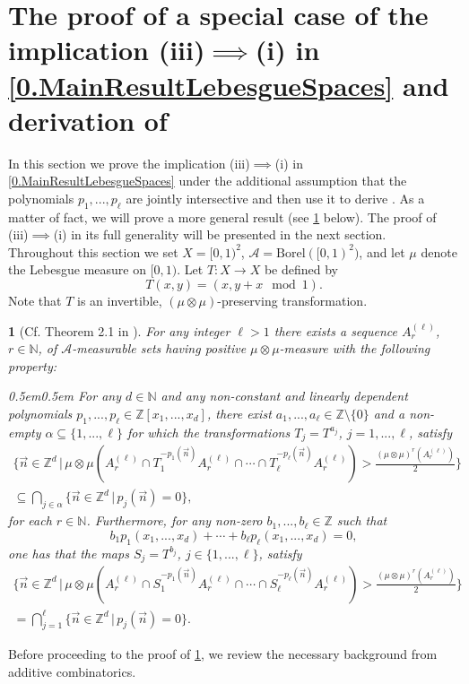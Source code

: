 \documentclass[11pt,american,preprint]{elsarticle}
\numberwithin{equation}{section}
\theoremstyle{plain}
\newtheorem{thm}{\protect\theoremname}[section]
\theoremstyle{plain*}
\theoremstyle{plain}
\theoremstyle{plain*}
\theoremstyle{plain}
\theoremstyle{plain*}
\theoremstyle{remark}
\theoremstyle{remark*}
\theoremstyle{remark}
\theoremstyle{remark*}
\theoremstyle{remark}
\theoremstyle{remark*}
\theoremstyle{plain}
\theoremstyle{definition}
\theoremstyle{plain}
\theoremstyle{plain} %
\providecommand{\theoremname}{Theorem}
\newcommand{\N}{\mathbb{N}}
\newcommand{\Z}{\mathbb{Z}}
\begin{document}
\section{The proof of  a special case of the implication (iii)$\implies$(i) in \cref{0.MainResultLebesgueSpaces} and derivation of }\label{Sec:5}
In this section we prove the implication (iii)$\implies$(i) in \cref{0.MainResultLebesgueSpaces} under the additional assumption that the polynomials $p_1,...,p_\ell$ are jointly intersective and then use it to derive . As a matter of fact, we will prove a more general result (see \cref{5.thm:SmallIntersections} below). The proof of  (iii)$\implies$(i) in its full generality will be presented in the next section. \\ 
Throughout this section we  set $X=[0,1)^2$, $\mathcal A=\text{Borel}([0,1)^2)$, and let $\mu$ denote the Lebesgue measure on $[0,1)$. Let $T:X\rightarrow X$ be defined by 
$$
T(x,y)=(x,y+x\mod 1).
$$
Note that $T$ is an invertible, $(\mu\otimes\mu)$-preserving transformation.
\begin{thm}[Cf. Theorem 2.1 in \cite{BHKNilSystems2005}]\label{5.thm:SmallIntersections}
    For any integer $\ell>1$ there exists a sequence $A_r^{(\ell)}$, $r\in\N$,  of  $\mathcal A$-measurable sets having positive $\mu\otimes\mu$-measure with the following property:\\
    \begin{adjustwidth}{0.5em}{0.5em}
    For any $d\in\N$ and any non-constant and linearly dependent polynomials $p_1,...,p_\ell\in\Z[x_1,...,x_d]$, there exist $a_1,...,a_\ell\in\Z\setminus\{0\}$ and a non-empty $\alpha\subseteq \{1,...,\ell\}$ for which the transformations $T_j=T^{a_j}$, $j=1,...,\ell$, satisfy 
    \begin{multline}\label{LongExpressionsWithFewElements}
\{\vec n\in\Z^d\,|\,\mu\otimes\mu(A_r^{(\ell)}\cap T_1^{-p_1(\vec n)}A_r^{(\ell)}\cap\cdots\cap T_\ell^{- p_\ell(\vec n)}A_r^{(\ell)})
>\frac{(\mu\otimes\mu)^r(A_r^{(\ell)})}{2}\}\\
\subseteq \bigcap_{j\in\alpha}\{\vec n\in\Z^d\,|\,p_j(\vec n)=0\}, 
    \end{multline}
for each $r\in\N$. 
Furthermore, for any non-zero $b_1,...,b_\ell\in\Z$  such that 
$$b_1p_1(x_1,...,x_d)+\cdots+b_\ell p_\ell(x_1,...,x_d)=0,$$
one has that the maps $S_j=T^{b_j}$, $j\in\{1,...,\ell\}$, satisfy
\begin{multline}\label{ShortExpressionWithFewElements}
\{\vec n\in\Z^d\,|\,\mu\otimes\mu(A_r^{(\ell)}\cap S_1^{-p_1(\vec n)}A_r^{(\ell)}\cap\cdots\cap S_\ell^{- p_\ell(\vec n)}A_r^{(\ell)})>\frac{(\mu\otimes\mu)^r(A_r^{(\ell)})}{2}\}\\
=\bigcap_{j=1}^\ell \{\vec n\in\Z^d\,|\,p_j(\vec n)=0\}.
\end{multline}
\end{adjustwidth}
\end{thm}
Before proceeding to the proof of \cref{5.thm:SmallIntersections}, we review the necessary background from additive combinatorics. 
\end{document}
